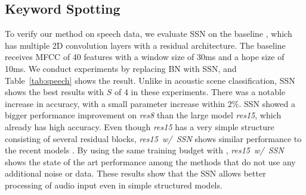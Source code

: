 \documentclass{article}
\begin{document}
\begin{table}[t]
\caption{Results on Google Speech Command dataset. The numbers marked with $^*$ are taken from each paper, and $\ddag$ denotes the result of training the same epoch as \cite{choi2019temporal}.}
\vskip 0.1in
\label{tab:speech}
\end{table}

\subsection{Keyword Spotting}

To verify our method on speech data, we evaluate SSN on the baseline \cite{tang2018deep}, which has multiple 2D convolution layers with a residual architecture. The baseline receives MFCC of 40 features with a window size of 30ms and a hope size of 10ms.
We conduct experiments by replacing BN with SSN, and Table~\ref{tab:speech} shows the result. Unlike in acoustic scene classification, SSN shows the best results with $S$ of 4 in these experiments. There was a notable increase in accuracy, with a small parameter increase within 2\%. SSN showed a bigger performance improvement on \textit{res8} than the large model \textit{res15}, which already has high accuracy. Even though \textit{res15} has a very simple structure consisting of several residual blocks, \textit{res15~w/~SSN} shows similar performance to the recent models \cite{choi2019temporal, lin2018edgespeechnets}. By using the same training budget with \cite{choi2019temporal}, \textit{res15~w/~SSN} shows the state of the art performance among the methods that do not use any additional noise or data. These results show that the SSN allows better processing of audio input even in simple structured models.
\end{document}
